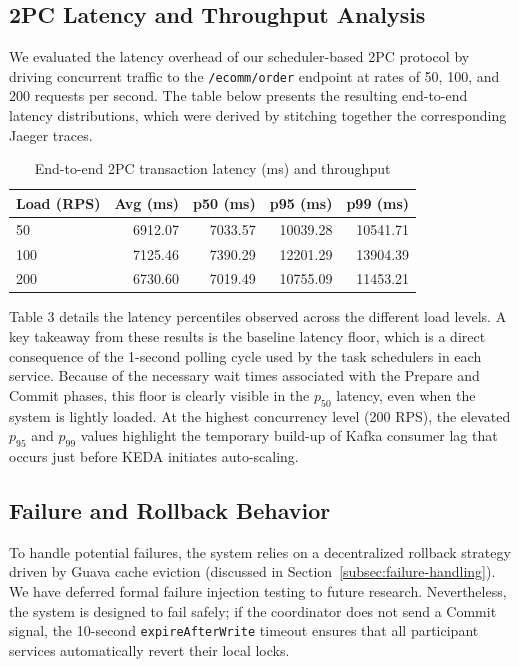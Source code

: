 \subsection{2PC Latency and Throughput Analysis}
\label{subsec:latency-results}

We evaluated the latency overhead of our scheduler-based 2PC protocol by 
driving concurrent traffic to the \texttt{/ecomm/order} endpoint at rates 
of 50, 100, and 200 requests per second.
%
The table below presents the resulting end-to-end latency distributions, 
which were derived by stitching together the corresponding Jaeger traces.

\begin{table}[htbp]
  \caption{End-to-end 2PC transaction latency (ms) and throughput}
  \label{tab:latency-results}
  \centering
  \begin{tabular}{lrrrr}
    \toprule
    \textbf{Load (RPS)} & \textbf{Avg (ms)} & \textbf{p50 (ms)} & \textbf{p95 (ms)} & \textbf{p99 (ms)} \\
    \midrule
    50   & 6912.07 & 7033.57 & 10039.28 & 10541.71 \\
    100  & 7125.46 & 7390.29 & 12201.29 & 13904.39 \\
    200  & 6730.60 & 7019.49 & 10755.09 & 11453.21 \\
    \bottomrule
  \end{tabular}
\end{table}

Table 3 details the latency percentiles observed across the different load levels.
%
A key takeaway from these results is the baseline latency floor, which is a
direct consequence of the 1-second polling cycle used by the task schedulers
in each service.
%
Because of the necessary wait times associated with the Prepare and Commit
phases, this floor is clearly visible in the $p_{50}$ latency, even when the
system is lightly loaded.
%
At the highest concurrency level (200 RPS), the elevated $p_{95}$ and $p_{99}$
values highlight the temporary build-up of Kafka consumer lag that occurs just
before KEDA initiates auto-scaling.

\subsection{Failure and Rollback Behavior}
\label{subsec:failure-results}
To handle potential failures, the system relies on a decentralized rollback
strategy driven by Guava cache eviction (discussed in
Section~\ref{subsec:failure-handling}).
%
We have deferred formal failure injection testing to future research.
%
Nevertheless, the system is designed to fail safely; if the coordinator does
not send a Commit signal, the 10-second \texttt{expireAfterWrite} timeout
ensures that all participant services automatically revert their local locks.

